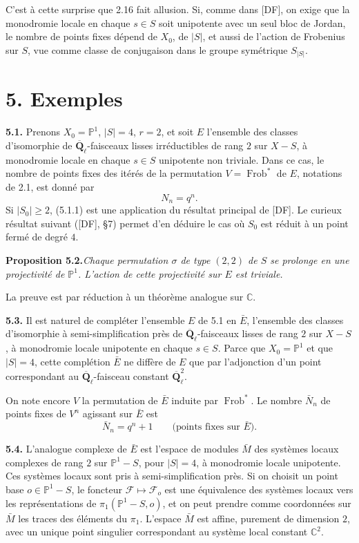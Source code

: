 \documentclass[11pt]{article}
\newcommand{\Qbl}{\overline{\mathbf{Q}}_{\ell}}
\newcommand{\Frob}{\operatorname{Frob}}
\newcommand{\C}{\mathbb{C}}
\newcommand{\Pone}{\mathbb{P}^{1}}
\newcommand{\para}[1]{\medskip\noindent\textbf{#1}\enspace}
\begin{document}
C'est à cette surprise que 2.16 fait allusion. Si, comme dans [DF], on exige que la monodromie locale en chaque \(s\in S\) soit unipotente avec un seul bloc de Jordan, le nombre de points fixes dépend de \(X_0\), de \(|S|\), et aussi de l'action de Frobenius sur \(S\), vue comme classe de conjugaison dans le groupe symétrique \(S_{|S|}\).

\section*{5. Exemples}

\para{5.1.} Prenons \(X_0=\Pone\), \(|S|=4\), \(r=2\), et soit \(E\) l'ensemble des classes d'isomorphie de \(\Qbl\)-faisceaux lisses irréductibles de rang \(2\) sur \(X-S\), à monodromie locale en chaque \(s\in S\) unipotente non triviale. Dans ce cas, le nombre de points fixes des itérés de la permutation \(V=\Frob^*\) de \(E\), notations de 2.1, est donné par
\begin{equation}
  N_n=q^n.
\tag{5.1.1}
\end{equation}
Si \(|S_0|\geq 2\), (5.1.1) est une application du résultat principal de [DF]. Le curieux résultat suivant ([DF], §7) permet d'en déduire le cas où \(S_0\) est réduit à un point fermé de degré \(4\).

\noindent\textbf{Proposition 5.2.}\quad\textit{Chaque permutation \(\sigma\) de type \((2,2)\) de \(S\) se prolonge en une projectivité de \(\Pone\). L'action de cette projectivité sur \(E\) est triviale.}

La preuve est par réduction à un théorème analogue sur \(\C\).

\para{5.3.} Il est naturel de compléter l'ensemble \(E\) de 5.1 en \(\bar E\), l'ensemble des classes d'isomorphie à semi-simplification près de \(\Qbl\)-faisceaux lisses de rang \(2\) sur \(X-S\), à monodromie locale unipotente en chaque \(s\in S\). Parce que \(X_0=\Pone\) et que \(|S|=4\), cette complétion \(\bar E\) ne diffère de \(E\) que par l'adjonction d'un point correspondant au \(\Qbl\)-faisceau constant \(\Qbl^2\).

On note encore \(V\) la permutation de \(\bar E\) induite par \(\Frob^*\). Le nombre \(\bar N_n\) de points fixes de \(V^n\) agissant sur \(\bar E\) est
\begin{equation}
  \bar N_n=q^n+1 \qquad \text{(points fixes sur \(\bar E\)).}
\tag{5.3.1}
\end{equation}

\para{5.4.} L'analogue complexe de \(\bar E\) est l'espace de modules \(\bar M\) des systèmes locaux complexes de rang \(2\) sur \(\Pone-S\), pour \(|S|=4\), à monodromie locale unipotente. Ces systèmes locaux sont pris à semi-simplification près. Si on choisit un point base \(o\in\Pone-S\), le foncteur \(\mathcal F\mapsto \mathcal F_o\) est une équivalence des systèmes locaux vers les représentations de \(\pi_1(\Pone-S,o)\), et on peut prendre comme coordonnées sur \(\bar M\) les traces des éléments du \(\pi_1\). L'espace \(\bar M\) est affine, purement de dimension \(2\), avec un unique point singulier correspondant au système local constant \(\C^2\).
\end{document}
